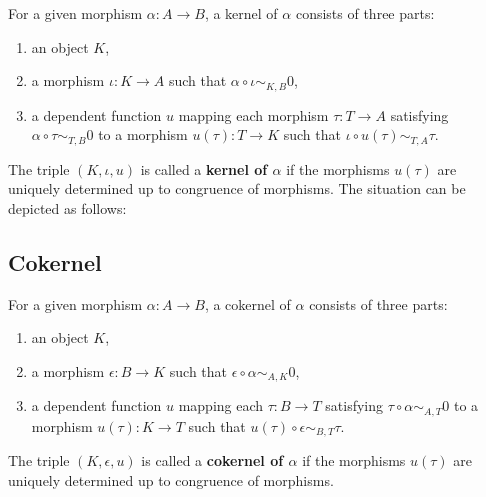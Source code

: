 \begin{definition}
  For a given morphism $\alpha: A \rightarrow B$, a kernel of $\alpha$ consists of three parts:
 \begin{enumerate}
  \item an object $K$,
  \item a morphism $\iota: K \rightarrow A$ such that $\alpha \circ \iota \sim_{K,B} 0$,
  \item a dependent function $u$ mapping each morphism $\tau: T \rightarrow A$ satisfying $\alpha \circ \tau \sim_{T,B} 0$ to
  a morphism $u(\tau): T \rightarrow K$ such that $\iota \circ u( \tau ) \sim_{T,A} \tau$. 
 \end{enumerate}
 The triple $( K, \iota, u )$ is called a \textbf{kernel of $\alpha$} if the morphisms $u( \tau )$ are uniquely determined up to
 congruence of morphisms. The situation can be depicted as follows:
 
 \begin{center}
\end{center}
\end{definition}

\subsection{Cokernel}

\begin{definition}
 For a given morphism $\alpha: A \rightarrow B$, a cokernel of $\alpha$ consists of three parts:
 \begin{enumerate}
  \item an object $K$,
  \item a morphism $\epsilon: B \rightarrow K$ such that $\epsilon \circ \alpha \sim_{A,K} 0$,
  \item a dependent function $u$ mapping each $\tau: B \rightarrow T$ satisfying $\tau \circ \alpha \sim_{A, T} 0$
        to a morphism $u(\tau):K \rightarrow T$ such that $u(\tau) \circ \epsilon \sim_{B,T} \tau$.
 \end{enumerate}
  The triple $( K, \epsilon, u )$ is called a \textbf{cokernel of $\alpha$} if the morphisms $u( \tau )$ are uniquely determined up to
 congruence of morphisms.
\end{definition}

